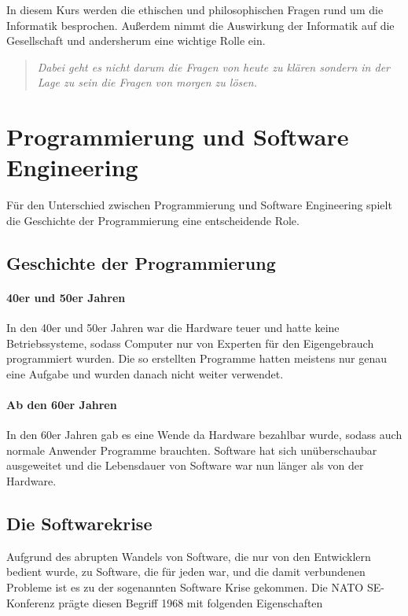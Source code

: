 \documentclass[../main.tex]{subfiles}
\begin{document}
    In diesem Kurs werden die ethischen und philosophischen Fragen rund um die Informatik besprochen. Außerdem nimmt die Auswirkung der Informatik auf die Gesellschaft und andersherum eine wichtige Rolle ein.
    
    \begin{quote}
        \emph{Dabei geht es nicht darum die Fragen von heute zu klären sondern in der Lage zu sein die Fragen von morgen zu lösen.}
    \end{quote}
    \clearpage

    \section{Programmierung und Software Engineering}
        Für den Unterschied zwischen Programmierung und Software Engineering spielt die Geschichte der Programmierung eine entscheidende Role.
        
        \subsection{Geschichte der Programmierung}
        
            \paragraph{40er und 50er Jahren}
                In den 40er und 50er Jahren war die Hardware teuer und hatte keine Betriebssysteme, sodass Computer nur von Experten für den Eigengebrauch programmiert wurden. Die so erstellten Programme hatten meistens nur genau eine Aufgabe und wurden danach nicht weiter verwendet.
                
            \paragraph{Ab den 60er Jahren}
                In den 60er Jahren gab es eine Wende da Hardware bezahlbar wurde, sodass auch normale Anwender Programme brauchten. Software hat sich unüberschaubar ausgeweitet und die Lebensdauer von Software war nun länger als von der Hardware.
            
        \subsection{Die Softwarekrise}
            Aufgrund des abrupten Wandels von Software, die nur von den Entwicklern bedient wurde, zu Software, die für jeden war, und die damit verbundenen Probleme ist es zu der sogenannten Software Krise gekommen. Die NATO SE-Konferenz prägte diesen Begriff 1968 mit folgenden Eigenschaften
            
\end{document}
